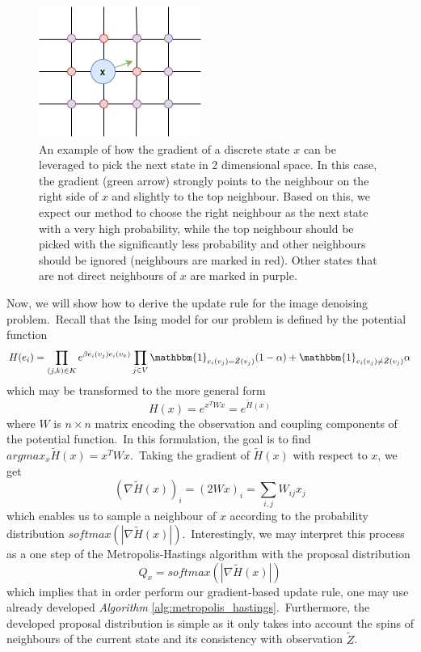 \documentclass[a4paper, 11pt, onecolumn, openany, titlepage]{report}
\theoremstyle{default_theorem_style}\newtheorem{theorem}{Theorem}
\theoremstyle{default_theorem_style}\newtheorem{definition}{Definition}
\begin{document}
\begin{figure}[H]
\centering
\includegraphics[scale=0.8]{gradient_example}
\caption{An example of how the gradient of a discrete state $x$ can be leveraged to pick the next state in 2
dimensional space. In this case, the gradient (green arrow) strongly points to the neighbour on the right side
of $x$ and slightly to the top neighbour. Based on this, we expect our method to choose the right neighbour as the
next state with a very high probability, while the top neighbour should be picked with the significantly less
probability and other neighbours should be ignored (neighbours are marked in red). Other states that are not direct
neighbours of $x$ are marked in purple.}
\label{fig:gradient_example}
\end{figure}

Now, we will show how to derive the update rule for the image denoising problem.\ Recall that the Ising model
for our problem is defined by the potential function
$$
H(e_i) = \prod\limits_{(j, k) \in K} e^{\beta e_i(v_j)e_i(v_k)}
\prod\limits_{j \in V} \mathbbm{1}_{e_i(v_j) = \tilde{Z}(v_j)}(1 - \alpha) +
\mathbbm{1}_{e_i(v_j) \neq \tilde{Z}(v_j)}\alpha
$$
which may be transformed to the more general form
$$
H(x) = e^{x^T W x} = e^{\tilde{H}(x)}
$$
where $W$ is $n \times n$ matrix encoding the observation and coupling components of the potential function.\ In
this formulation, the goal is to find $argmax_x \tilde{H}(x) = x^T W x$.\ Taking the gradient of
$\tilde{H}(x)$ with respect to $x$, we get
$$
(\nabla \tilde{H}(x))_i = (2W x)_i = \sum_{i, j} W_{ij} x_j
$$
which enables us to sample a neighbour of $x$ according to the probability distribution
$softmax(|\nabla \tilde{H}(x)|)$.\ Interestingly, we may interpret this process as a one step of the
Metropolis-Hastings algorithm with the proposal distribution
$$
Q_x = softmax(|\nabla \tilde{H}(x)|)
$$
which implies that in order perform our gradient-based update rule, one may use already developed
\textit{Algorithm} \ref{alg:metropolis_hastings}.\ Furthermore, the developed proposal distribution is simple as
it only takes into account the spins of neighbours of the current state and its consistency with observation
$\tilde{Z}$.
\end{document}
